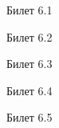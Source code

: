 \documentclass[a4paper,12pt]{article}
\begin{document}
\newpage
\begin{mybox}{\hypertarget{bil6_1}{Билет 6.1}}
\end{mybox}
\newpage
\begin{mybox}{\hypertarget{bil6_2}{Билет 6.2}}
\end{mybox}
\newpage
\begin{mybox}{\hypertarget{bil6_3}{Билет 6.3}}
\end{mybox}
\newpage
\begin{mybox}{\hypertarget{bil6_4}{Билет 6.4}}
\end{mybox}
\newpage
\begin{mybox}{\hypertarget{bil6_5}{Билет 6.5}}
\end{mybox}
\end{document}
